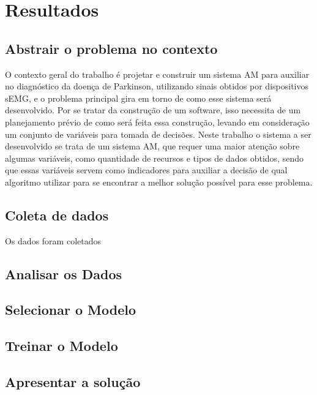 \chapter[Resultados]{Resultados}
\section{Abstrair o problema no contexto}
O contexto geral do trabalho é projetar e construir um sistema AM para auxiliar no diagnóstico da doença de Parkinson, utilizando sinais obtidos por dispositivos sEMG, e o problema principal gira em torno de como esse sistema será desenvolvido. Por se tratar da construção de um software, isso necessita de um planejamento prévio de como será feita essa construção, levando em consideração um conjunto de variáveis para tomada de decisões. Neste trabalho o sistema a ser desenvolvido se trata de um sistema AM, que requer uma maior atenção sobre algumas variáveis, como quantidade de recursos e tipos de dados obtidos, sendo que essas variáveis servem como indicadores para auxiliar a decisão de qual algoritmo utilizar para se encontrar a melhor solução possível para esse problema.

\section{Coleta de dados}
Os dados foram coletados 
\section{Analisar os Dados}
\section{Selecionar o Modelo}
\section{Treinar o Modelo}
\section{Apresentar a solução}